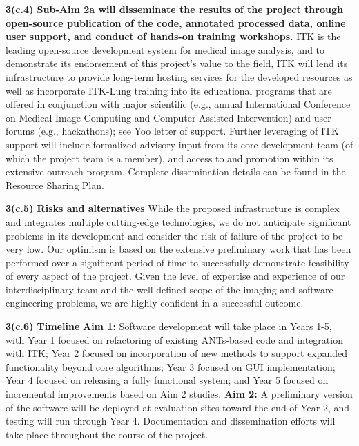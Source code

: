 \documentclass[11pt,]{article}
\begin{document}
\textbf{3(c.4) Sub-Aim 2a will disseminate the results of the project
through open-source publication of the code, annotated processed data,
online user support, and conduct of hands-on training workshops.} ITK is
the leading open-source development system for medical image analysis,
and to demonstrate its endorsement of this project's value to the field,
ITK will lend its infrastructure to provide long-term hosting services
for the developed resources as well as incorporate ITK-Lung training
into its educational programs that are offered in conjunction with major
scientific (e.g., annual International Conference on Medical Image
Computing and Computer Assisted Intervention) and user forums (e.g.,
hackathons); see Yoo letter of support. Further leveraging of ITK
support will include formalized advisory input from its core development
team (of which the project team is a member), and access to and
promotion within its extensive outreach program. Complete dissemination
details can be found in the Resource Sharing Plan.

\textbf{3(c.5) Risks and alternatives} While the proposed infrastructure
is complex and integrates multiple cutting-edge technologies, we do not
anticipate significant problems in its development and consider the risk
of failure of the project to be very low. Our optimism is based on the
extensive preliminary work that has been performed over a significant
period of time to successfully demonstrate feasibility of every aspect
of the project. Given the level of expertise and experience of our
interdisciplinary team and the well-defined scope of the imaging and
software engineering problems, we are highly confident in a successful
outcome.

\textbf{3(c.6) Timeline} \textbf{Aim 1:} Software development will take
place in Years 1-5, with Year 1 focused on refactoring of existing
ANTs-based code and integration with ITK; Year 2 focused on
incorporation of new methods to support expanded functionality beyond
core algorithms; Year 3 focused on GUI implementation; Year 4 focused on
releasing a fully functional system; and Year 5 focused on incremental
improvements based on Aim 2 studies. \textbf{Aim 2:} A preliminary
version of the software will be deployed at evaluation sites toward the
end of Year 2, and testing will run through Year 4. Documentation and
dissemination efforts will take place throughout the course of the
project.

\clearpage

\newpage
\end{document}
